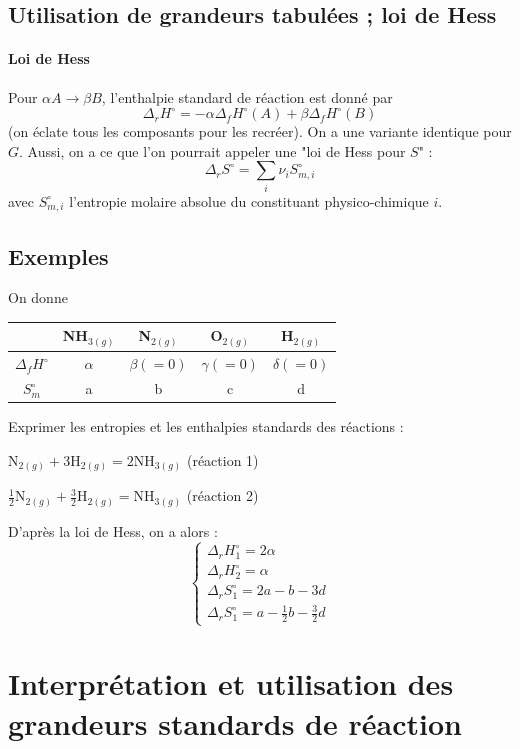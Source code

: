 \documentclass[french]{book}
\theoremstyle{plain}
\theoremstyle{definition}
\theoremstyle{remark}
\begin{document}
\subsection{Utilisation de grandeurs tabulées ; loi de Hess}
\paragraph{Loi de Hess} Pour $\alpha A\to\beta B$, l’enthalpie standard de réaction est donné par $$\Delta_rH^\circ=-\alpha\Delta_fH^\circ(A)+\beta\Delta_fH^\circ(B)$$ (on éclate tous les composants pour les recréer). On a une variante identique pour $G$. Aussi, on a ce que l'on pourrait appeler une "loi de Hess pour $S$" : $$\Delta_rS^\circ=\sum_i\nu_iS_{m,i}^\circ$$ avec $S_{m,i}^\circ$ l'entropie molaire absolue du constituant physico-chimique $i$.
\subsection{Exemples}
On donne 
\begin{center}
	\begin{tabular}{|c|c|c|c|c|}
		\hline
		&NH$_{3(g)}$&N$_{2(g)}$&O$_{2(g)}$&H$_{2(g)}$ \\
		\hline
		$\Delta_fH^\circ$&$\alpha$&$\beta(=0)$&$\gamma(=0)$&$\delta(=0)$ \\
		\hline
		$S_m^\circ$&a&b&c&d \\
		\hline
	\end{tabular}
\end{center}
Exprimer les entropies et les enthalpies standards des réactions : 
\begin{center}
	$\text{N}_{2(g)}+3\text{H}_{2(g)}=2\text{NH}_{3(g)}$ (réaction 1)
\end{center}
\begin{center}
	$\displaystyle \frac12 \text{N}_{2(g)}+\frac32 \text{H}_{2(g)}=\text{NH}_{3(g)}$ (réaction 2)
\end{center}
D'après la loi de Hess, on a alors : $$\begin{cases}
	\Delta_rH_1^\circ= 2\alpha\\
	\Delta_rH_2^\circ= \alpha \\
	\Delta_rS_1^\circ= 2a-b-3d \\
	\displaystyle\Delta_rS_1^\circ= a-\frac12 b-\frac32 d
\end{cases}$$
\section{Interprétation et utilisation des grandeurs standards de réaction}
\end{document}
